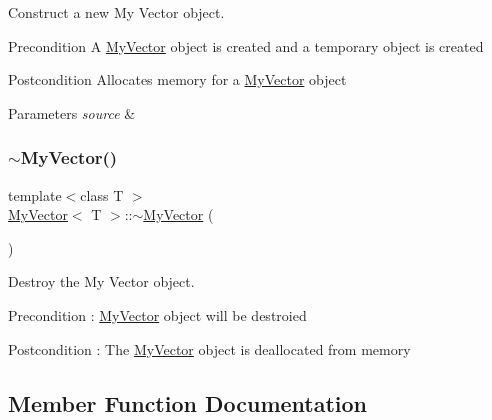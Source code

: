 Construct a new My Vector object. 

\begin{DoxyPrecond}{Precondition}
A \mbox{\hyperlink{class_my_vector}{My\+Vector}} object is created and a temporary object is created 
\end{DoxyPrecond}
\begin{DoxyPostcond}{Postcondition}
Allocates memory for a \mbox{\hyperlink{class_my_vector}{My\+Vector}} object 
\end{DoxyPostcond}

\begin{DoxyParams}{Parameters}
{\em source} & \\
\hline
\end{DoxyParams}
\mbox{\label{class_my_vector_abe59f181259ff63fa583f4bd87a9737e}} 
\subsubsection{\texorpdfstring{$\sim$MyVector()}{~MyVector()}}
{\footnotesize\ttfamily template$<$class T $>$ \\
\mbox{\hyperlink{class_my_vector}{My\+Vector}}$<$ T $>$\+::$\sim$\mbox{\hyperlink{class_my_vector}{My\+Vector}} (\begin{DoxyParamCaption}{ }\end{DoxyParamCaption})}



Destroy the My Vector object. 

\begin{DoxyPrecond}{Precondition}
\+: \mbox{\hyperlink{class_my_vector}{My\+Vector}} object will be destroied 
\end{DoxyPrecond}
\begin{DoxyPostcond}{Postcondition}
\+: The \mbox{\hyperlink{class_my_vector}{My\+Vector}} object is deallocated from memory 
\end{DoxyPostcond}


\subsection{Member Function Documentation}
\mbox{\label{class_my_vector_a6a8887b23b9458bf8ec4cc95749d3eec}} 
